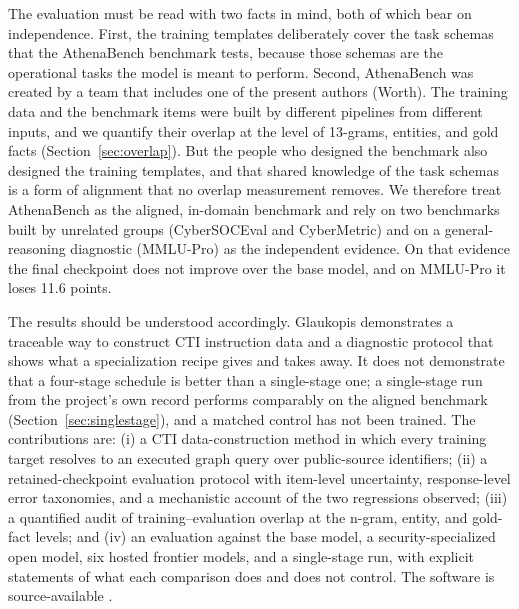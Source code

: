 \documentclass[twocolumn]{svjour3}
\begin{document}
The evaluation must be read with two facts in mind, both of which bear on independence. First, the training templates deliberately cover the task schemas that the AthenaBench benchmark tests, because those schemas are the operational tasks the model is meant to perform. Second, AthenaBench was created by a team that includes one of the present authors (Worth). The training data and the benchmark items were built by different pipelines from different inputs, and we quantify their overlap at the level of 13-grams, entities, and gold facts (Section~\ref{sec:overlap}). But the people who designed the benchmark also designed the training templates, and that shared knowledge of the task schemas is a form of alignment that no overlap measurement removes. We therefore treat AthenaBench as the aligned, in-domain benchmark and rely on two benchmarks built by unrelated groups (CyberSOCEval and CyberMetric) and on a general-reasoning diagnostic (MMLU-Pro) as the independent evidence. On that evidence the final checkpoint does not improve over the base model, and on MMLU-Pro it loses 11.6 points.

The results should be understood accordingly. Glaukopis demonstrates a traceable way to construct CTI instruction data and a diagnostic protocol that shows what a specialization recipe gives and takes away. It does not demonstrate that a four-stage schedule is better than a single-stage one; a single-stage run from the project's own record performs comparably on the aligned benchmark (Section~\ref{sec:singlestage}), and a matched control has not been trained. The contributions are: (i) a CTI data-construction method in which every training target resolves to an executed graph query over public-source identifiers; (ii) a retained-checkpoint evaluation protocol with item-level uncertainty, response-level error taxonomies, and a mechanistic account of the two regressions observed; (iii) a quantified audit of training--evaluation overlap at the n-gram, entity, and gold-fact levels; and (iv) an evaluation against the base model, a security-specialized open model, six hosted frontier models, and a single-stage run, with explicit statements of what each comparison does and does not control. The software is source-available \cite{glaukopis2026software}.
\end{document}
